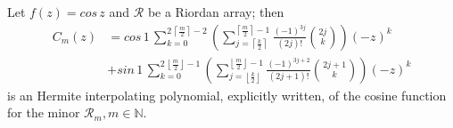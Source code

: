 
\begin{theorem}
\label{thm:cos-Hermite-interpolating-polys}
Let $f(z)=cos\,{z}$ and $\mathcal{R}$ be a Riordan array; then 
\begin{equation}
  \begin{split}
  \label{eq:cos-Hermite-interpolating-poly-implicit}
  C_{m}(z)  &= cos\,{1}\,\sum_{k=0}^{2\,\left\lceil \frac{m}{2} \right\rceil-2}{\left(\sum_{j=\left\lceil \frac{k}{2}\right\rceil}^{\left\lceil \frac{m}{2} \right\rceil -1}{\frac{(-1)^{3j}}{(2j)!}{2j\choose k}}\right) {(-z)^{k}}}\\
            &+ sin\,{1}\,\sum_{k=0}^{2\,\left\lfloor \frac{m}{2} \right\rfloor-1}{\left(\sum_{j=\left\lfloor \frac{k}{2}\right\rfloor}^{\left\lfloor \frac{m}{2} \right\rfloor -1}{\frac{(-1)^{3j+2}}{(2j + 1)!} {2j+1\choose k}}\right){(-z)^{k}}}
  \end{split}
\end{equation}
is an Hermite interpolating polynomial, explicitly written, of the cosine
function for the minor $\mathcal{R}_{m}, m\in\mathbb{N}$.
\end{theorem}

